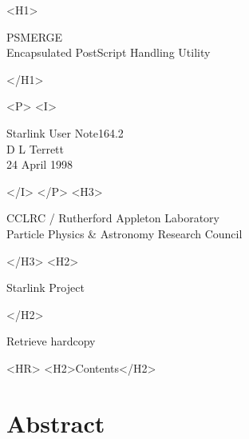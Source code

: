 \documentclass[twoside,11pt]{article}
\newcommand{\stardoccategory}  {Starlink User Note}
\newcommand{\stardocsource}    {sun\stardocnumber}
\newcommand{\stardocnumber}    {164.2}
\newcommand{\stardocauthors}   {D L Terrett}
\newcommand{\stardocdate}      {24 April 1998}
\newcommand{\stardoctitle}     {PSMERGE \\[2ex]
                                Encapsulated PostScript Handling Utility}
\newcommand{\stardocversion}   {[software-version]}
\newcommand{\stardocmanual}    {[manual-type]}
\newcommand{\htmladdnormallink}[2]{#1}
\newcommand{\htmladdimg}[1]{}
\newcommand{\htmlref}[2]{#1}
\newcommand{\htmladdtonavigation}[1]{}
\newcommand{\xlabel}[1]{}
\newcommand{\latexonlytoc}[0]{\tableofcontents}
\begin{document}
\begin{htmlonly}
   \xlabel{}
   \begin{rawhtml} <H1> \end{rawhtml}
      \stardoctitle\\
   \begin{rawhtml} </H1> \end{rawhtml}


   \begin{rawhtml} <P> <I> \end{rawhtml}
   \stardoccategory \stardocnumber \\
   \stardocauthors \\
   \stardocdate
   \begin{rawhtml} </I> </P> <H3> \end{rawhtml}
      \htmladdnormallink{CCLRC}{http://www.cclrc.ac.uk} /
      \htmladdnormallink{Rutherford Appleton Laboratory}
                        {http://www.cclrc.ac.uk/ral} \\
      \htmladdnormallink{Particle Physics \& Astronomy Research Council}
                        {http://www.pparc.ac.uk} \\
   \begin{rawhtml} </H3> <H2> \end{rawhtml}
      \htmladdnormallink{Starlink Project}{http://star-www.rl.ac.uk/}
   \begin{rawhtml} </H2> \end{rawhtml}
   \htmladdnormallink{\htmladdimg{source.gif} Retrieve hardcopy}
      {http://star-www.rl.ac.uk/cgi-bin/hcserver?\stardocsource}\\

  \label{stardoccontents}
  \begin{rawhtml} 
    <HR>
    <H2>Contents</H2>
  \end{rawhtml}
  \renewcommand{\latexonlytoc}[0]{}
  \htmladdtonavigation{\htmlref{\htmladdimg{contents_motif.gif}}
        {stardoccontents}}

  \section{\xlabel{abstract}Abstract}
\end{htmlonly}
\end{document}
